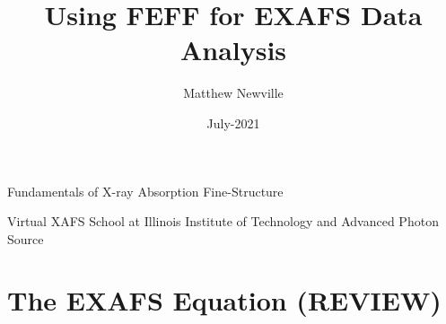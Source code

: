 \documentclass[9pt,aspectratio=1610]{beamer}
\begin{document}
\title[Virtual XAFS School]{Using FEFF for EXAFS Data Analysis}  %
\author[M Newville]{Matthew Newville}
\date{July-2021}


\begin{frame} \titlepage
  \vmm
  \begin{center}
    Fundamentals of X-ray Absorption Fine-Structure
  \end{center}

  \vmm

  \begin{cenpage}{60mm}
    Virtual XAFS School at Illinois Institute of Technology and Advanced
  Photon Source
\end{cenpage}
\end{frame}

\section{The EXAFS Equation (REVIEW)}





% 
% 
% 
% 
% 
% 
% 
\end{document}
